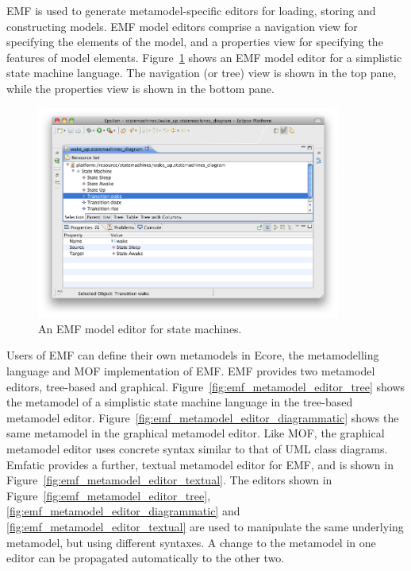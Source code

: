 EMF is used to generate metamodel-specific editors for loading, storing and constructing models. EMF model editors comprise a navigation view for specifying the elements of the model, and a properties view for specifying the features of model elements. Figure~\ref{fig:emf_model_editor} shows an EMF model editor for a simplistic state machine language. The navigation (or tree) view is shown in the top pane, while the properties view is shown in the bottom pane.

\begin{figure}[htbp]
  \begin{center}
    \leavevmode
    \includegraphics[width=10cm]{2.Background/images/emf_model_editor.png}
  \end{center}
  \caption{An EMF model editor for state machines.}
  \label{fig:emf_model_editor}
\end{figure}

Users of EMF can define their own metamodels in Ecore, the metamodelling language and MOF implementation of EMF. EMF provides two metamodel editors, tree-based and graphical. Figure~\ref{fig:emf_metamodel_editor_tree} shows the metamodel of a simplistic state machine language in the tree-based metamodel editor. Figure~\ref{fig:emf_metamodel_editor_diagrammatic} shows the same metamodel in the graphical metamodel editor. Like MOF, the graphical metamodel editor uses concrete syntax similar to that of UML class diagrams. Emfatic \cite{emfatic} provides a further, textual metamodel editor for EMF, and is shown in Figure~\ref{fig:emf_metamodel_editor_textual}. The editors shown in Figure~\ref{fig:emf_metamodel_editor_tree}, \ref{fig:emf_metamodel_editor_diagrammatic} and \ref{fig:emf_metamodel_editor_textual} are used to manipulate the same underlying metamodel, but using different syntaxes. A change to the metamodel in one editor can be propagated automatically to the other two.

